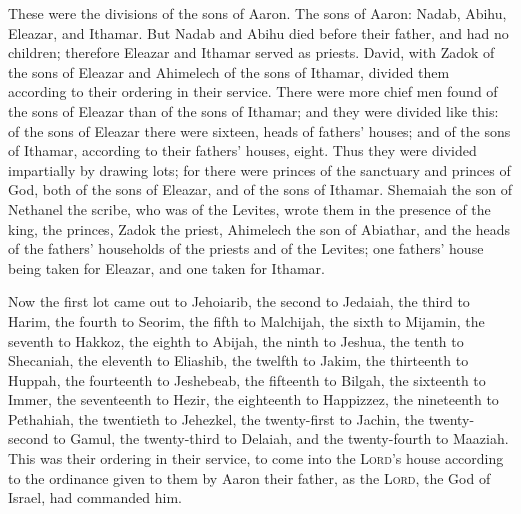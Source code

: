  These were the divisions of the sons of Aaron. The sons
of Aaron: Nadab, Abihu, Eleazar, and Ithamar.  But Nadab
and Abihu died before their father, and had no children; therefore
Eleazar and Ithamar served as priests.  David, with Zadok
of the sons of Eleazar and Ahimelech of the sons of Ithamar, divided
them according to their ordering in their service.  There
were more chief men found of the sons of Eleazar than of the sons of
Ithamar; and they were divided like this: of the sons of Eleazar there
were sixteen, heads of fathers' houses; and of the sons of Ithamar,
according to their fathers' houses, eight.  Thus they were
divided impartially by drawing lots; for there were princes of the
sanctuary and princes of God, both of the sons of Eleazar, and of the
sons of Ithamar.  Shemaiah the son of Nethanel the scribe,
who was of the Levites, wrote them in the presence of the king, the
princes, Zadok the priest, Ahimelech the son of Abiathar, and the heads
of the fathers' households of the priests and of the Levites; one
fathers' house being taken for Eleazar, and one taken for Ithamar.

 Now the first lot came out to Jehoiarib, the second to
Jedaiah,  the third to Harim, the fourth to Seorim,
 the fifth to Malchijah, the sixth to Mijamin,
 the seventh to Hakkoz, the eighth to Abijah,
 the ninth to Jeshua, the tenth to Shecaniah,
 the eleventh to Eliashib, the twelfth to Jakim,
 the thirteenth to Huppah, the fourteenth to Jeshebeab,
 the fifteenth to Bilgah, the sixteenth to Immer,
 the seventeenth to Hezir, the eighteenth to Happizzez,
 the nineteenth to Pethahiah, the twentieth to Jehezkel,
 the twenty-first to Jachin, the twenty-second to Gamul,
 the twenty-third to Delaiah, and the twenty-fourth to
Maaziah.  This was their ordering in their service, to
come into the \textsc{Lord}'s house according to the ordinance given to
them by Aaron their father, as the \textsc{Lord}, the God of Israel, had
commanded him.

